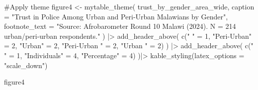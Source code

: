 \documentclass[
  letterpaper,
  DIV=11,
  numbers=noendperiod]{scrartcl}
\newenvironment{Shaded}{\begin{snugshade}}{\end{snugshade}}
\newcommand{\AttributeTok}[1]{\textcolor[rgb]{0.40,0.45,0.13}{#1}}
\newcommand{\CommentTok}[1]{\textcolor[rgb]{0.37,0.37,0.37}{#1}}
\newcommand{\DecValTok}[1]{\textcolor[rgb]{0.68,0.00,0.00}{#1}}
\newcommand{\FunctionTok}[1]{\textcolor[rgb]{0.28,0.35,0.67}{#1}}
\newcommand{\NormalTok}[1]{\textcolor[rgb]{0.00,0.23,0.31}{#1}}
\newcommand{\OtherTok}[1]{\textcolor[rgb]{0.00,0.23,0.31}{#1}}
\newcommand{\SpecialCharTok}[1]{\textcolor[rgb]{0.37,0.37,0.37}{#1}}
\newcommand{\StringTok}[1]{\textcolor[rgb]{0.13,0.47,0.30}{#1}}
\begin{document}
\begin{Shaded}
\begin{Highlighting}[]
\CommentTok{\#Apply theme}
\NormalTok{figure4 }\OtherTok{\textless{}{-}} \FunctionTok{mytable\_theme}\NormalTok{(}
\NormalTok{  trust\_by\_gender\_area\_wide,}
  \AttributeTok{caption =} \StringTok{"Trust in Police Among Urban and Peri‑Urban Malawians by Gender"}\NormalTok{,}
  \AttributeTok{footnote\_text =} \StringTok{"Source: Afrobarometer Round 10 Malawi (2024). N = 214 urban/peri‑urban respondents."}
\NormalTok{  ) }\SpecialCharTok{|\textgreater{}}
  \FunctionTok{add\_header\_above}\NormalTok{(}
    \FunctionTok{c}\NormalTok{(}\StringTok{" "} \OtherTok{=} \DecValTok{1}\NormalTok{, }\StringTok{"Peri{-}Urban"} \OtherTok{=} \DecValTok{2}\NormalTok{, }\StringTok{"Urban"} \OtherTok{=} \DecValTok{2}\NormalTok{, }\StringTok{"Peri{-}Urban "} \OtherTok{=} \DecValTok{2}\NormalTok{, }\StringTok{"Urban "} \OtherTok{=} \DecValTok{2}\NormalTok{)}
\NormalTok{    ) }\SpecialCharTok{|\textgreater{}}
  \FunctionTok{add\_header\_above}\NormalTok{(}
    \FunctionTok{c}\NormalTok{(}\StringTok{" "} \OtherTok{=} \DecValTok{1}\NormalTok{, }\StringTok{"Individuals"} \OtherTok{=} \DecValTok{4}\NormalTok{, }\StringTok{"Percentage"} \OtherTok{=} \DecValTok{4}\NormalTok{)}
\NormalTok{    )}\SpecialCharTok{|\textgreater{}}
  \FunctionTok{kable\_styling}\NormalTok{(}\AttributeTok{latex\_options =} \StringTok{"scale\_down"}\NormalTok{)}

\NormalTok{figure4}
\end{Highlighting}
\end{Shaded}
\end{document}
